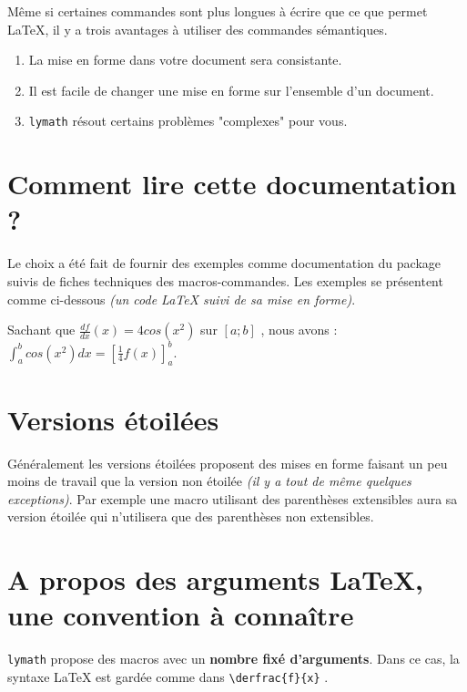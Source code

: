 \documentclass[12pt,a4paper]{article}
\theoremstyle{definition}
\begin{document}
Même si certaines commandes sont plus longues à écrire que ce que permet \LaTeX{}, il y a trois avantages à utiliser des commandes sémantiques.
\begin{enumerate}
	\item La mise en forme dans votre document sera consistante.

	\item Il est facile de changer une mise en forme sur l'ensemble d'un document.

	\item \verb+lymath+ résout certains problèmes "complexes" pour vous.
\end{enumerate}



\section{Comment lire cette documentation ?}

Le choix a été fait de fournir des exemples comme documentation du package suivis de fiches techniques des macros-commandes. Les exemples se présentent comme ci-dessous \textit{(un code \LaTeX{} suivi de sa mise en forme)}.

\begin{tcblisting}{}
Sachant que $\displaystyle \frac{df}{dx}(x) = 4 cos(x^2)$ sur $[a ; b]$ , nous avons :
$\displaystyle \int_a^b cos(x^2) dx = \left[ \frac{1}{4} f(x) \right]_a^b$.
\end{tcblisting}


\section{Versions étoilées}

Généralement les versions étoilées proposent des mises en forme faisant un peu moins de travail que la version non étoilée \textit{(il y a tout de même quelques exceptions)}. Par exemple une macro utilisant des parenthèses extensibles aura sa version étoilée qui n'utilisera que des parenthèses non extensibles.



\section{A propos des arguments \LaTeX, une convention à connaître}

\verb+lymath+ propose des macros avec un \textbf{nombre fixé d'arguments}. Dans ce cas, la syntaxe \LaTeX{} est gardée comme dans \verb+\derfrac{f}{x}+ .
\end{document}
